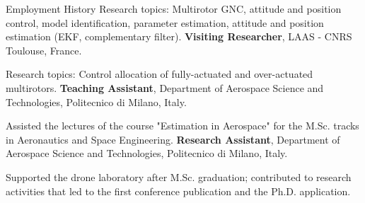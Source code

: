 \begin{rubric}{Employment History}
    Research topics: Multirotor GNC, attitude and position control, model identification, parameter estimation, attitude and position estimation (EKF, complementary filter).
%
\entry*[03/19 -- 07/19]
	\textbf{Visiting Researcher}, LAAS - CNRS Toulouse, France.
 
   Research topics: Control allocation of fully-actuated and over-actuated multirotors.
%
\entry*[2018 -- 2019]
	\textbf{Teaching Assistant}, Department of Aerospace Science and Technologies, Politecnico di Milano, Italy.
 
   Assisted the lectures of the course "Estimation in Aerospace" for the M.Sc. tracks in Aeronautics and Space Engineering.
%
\entry*[01/16 -- 11/16]
	\textbf{Research Assistant}, Department of Aerospace Science and Technologies, Politecnico di Milano, Italy.

    Supported the drone laboratory after M.Sc. graduation; contributed to research activities that led to the first conference publication and the Ph.D. application.
%
\end{rubric}
